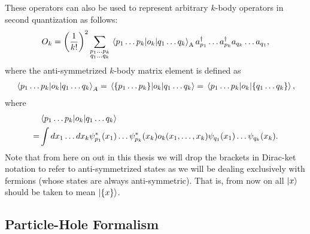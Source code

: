 \documentclass[Dual]{msu-thesis}
\begin{document}
These operators can also be used to represent arbitrary $k$-body operators in second quantization as follows:
\begin{align}
O_k
=
\left(\frac{1}{k!}\right)^2\sum_{\substack{p_1\ldots p_k \\ q_1\ldots q_k}}\mel{p_1\ldots p_k}{o_k}{q_1\ldots q_k}_\text{A}a^\dagger_{p_1}\ldots a^\dagger_{p_k}a_{q_k}\ldots a_{q_1},
\end{align}
where the anti-symmetrized $k$-body matrix element is defined as
\begin{align}
\mel{p_1\ldots p_k}{o_k}{q_1\ldots q_k}_A
=
\mel{\{p_1\ldots p_k\}}{o_k}{q_1\ldots q_k}
=
\mel{p_1\ldots p_k}{o_k}{\{q_1\ldots q_k\}},
\end{align}
where
\begin{align}
&\mel{p_1\ldots p_k}{o_k}{q_1\ldots q_k}
\nonumber
\\
=&
\int dx_1\ldots dx_k \psi_{p_1}^*(x_1)\ldots\psi_{p_k}^*(x_k)o_k(x_1,\ldots,x_k)\psi_{q_1}(x_1)\ldots\psi_{q_k}(x_k).
\end{align}
Note that from here on out in this thesis we will drop the brackets in Dirac-ket notation to refer to anti-symmetrized states as we will be dealing exclusively with fermions (whose states are always anti-symmetric). That is, from now on all $\ket{x}$ should be taken to mean $\ket{\{x\}}$. 

\subsection{Particle-Hole Formalism}
\end{document}
